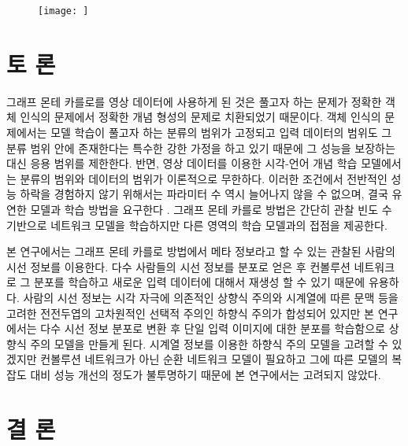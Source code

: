\documentclass{kcc}
\begin{document}
\begin{figure}
  \centerline{\texttt{[image: ]}}
  \caption{}
  \label{fig:memtest-nested}
\end{figure}
\fi

\section{토 론}

그래프 몬테 카를로를 영상 데이터에 사용하게 된 것은 풀고자 하는 문제가 정확한 객체 인식의 문제에서 정확한 개념 형성의 문제로 치환되었기 때문이다. 객체 인식의 문제에서는 모델 학습이 풀고자 하는 분류의 범위가 고정되고 입력 데이터의 범위도 그 분류 범위 안에 존재한다는 특수한 강한 가정을 하고 있기 때문에 그 성능을 보장하는 대신 응용 범위를 제한한다. 반면, 영상 데이터를 이용한 시각-언어 개념 학습 모델에서는 분류의 범위와 데이터의 범위가 이론적으로 무한하다. 이러한 조건에서 전반적인 성능 하락을 경험하지 않기 위해서는 파라미터 수 역시 늘어나지 않을 수 없으며, 결국 유연한 모델과 학습 방법을 요구한다 \cite{zhang1994incremental}. 그래프 몬테 카를로 방법은 간단히 관찰 빈도 수 기반으로 네트워크 모델을 학습하지만 다른 영역의 학습 모델과의 접점을 제공한다.

본 연구에서는 그래프 몬테 카를로 방법에서 메타 정보라고 할 수 있는 관찰된 사람의 시선 정보를 이용한다. 다수 사람들의 시선 정보를 분포로 얻은 후 컨볼루션 네트워크로 그 분포를 학습하고 새로운 입력 데이터에 대해서 재생성 할 수 있기 때문에 유용하다. 사람의 시선 정보는 시각 자극에 의존적인 상향식 주의와 시계열에 따른 문맥 등을 고려한 전전두엽의 고차원적인 선택적 주의인 하향식 주의가 합성되어 있지만 본 연구에서는 다수 시선 정보 분포로 변환 후 단일 입력 이미지에 대한 분포를 학습함으로 상향식 주의 모델을 만들게 된다. 시계열 정보를 이용한 하향식 주의 모델을 고려할 수 있겠지만 컨볼루션 네트워크가 아닌 순환 네트워크 모델이 필요하고 그에 따른 모델의 복잡도 대비 성능 개선의 정도가 불투명하기 때문에 본 연구에서는 고려되지 않았다.

\section{결 론}






\end{document}
